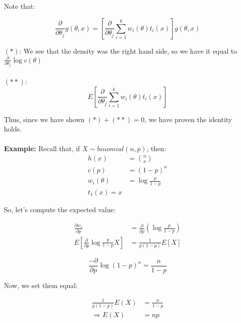 \documentclass{article}
\begin{document}
    Note that:
    
    \begin{equation*}
        \frac{\partial}{\partial \theta_j} g(\theta,x) = \left[\frac{\partial}{\partial \theta_j} \sum_{i=1}^k w_i(\theta)t_i(x) \right]g(\theta,x)
    \end{equation*}
    
    \noindent $(*)$:  We see that the density was the right hand side, so we have it equal to $\frac{\partial}{\partial \theta_j} \log c(\theta)$
    \\~\\
    \noindent $(**)$: 
    \begin{equation*}
        E\left[\frac{\partial}{\partial \theta_j} \sum_{i=1}^k w_i(\theta)t_i(x) \right]    
    \end{equation*}

    Thus, since we have shown $(*) + (**) = 0$, we have proven the identity holds.
\\~\\
   \noindent \textbf{Example:} Recall that, if $X\sim binomial(n,p)$, then:
   \begin{equation*}
       \begin{split}
           h(x) &= {n \choose x} \\
           c(p) &= (1-p)^n\\
           w_i(\theta) &= \log \frac{p}{1-p}\\
           t_1(x) = x
       \end{split}
   \end{equation*}
   
   So, let's compute the expected value:
   
   \begin{equation*}
   \begin{split}
        \frac{\partial w_1}{\partial p} &= \frac{\partial}{\partial p}\left(\log \frac{p}{1-p} \right)\\
        E\left[\frac{\partial}{\partial p} \log \frac{p}{1-p} X \right] &= \frac{1}{p(1-p)} E[X]
   \end{split}
    \end{equation*}
    
    \begin{equation*}
            \frac{-\partial}{\partial p} \log (1-p)^n = \frac{n}{1-p}
    \end{equation*}
    
    Now, we set them equal:
    
    \begin{equation*}
        \begin{split}
            \frac{1}{p(1-p)} E(X) &= \frac{n}{1-p}\\
            \Rightarrow E(X) &= np
        \end{split}
    \end{equation*}
   
   
\end{document}
